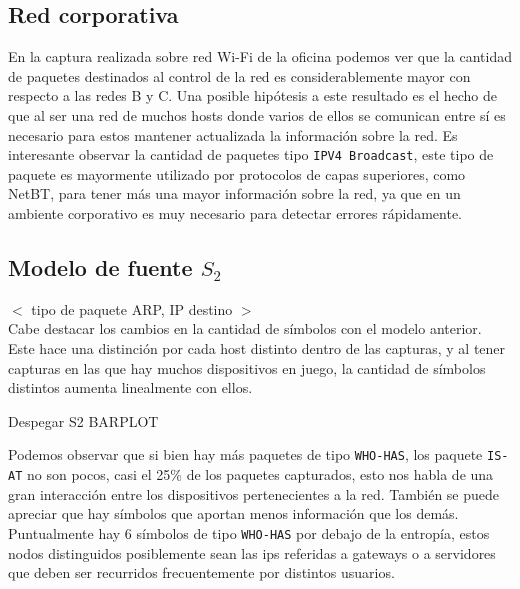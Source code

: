 \subsection{Red corporativa}

En la captura realizada sobre red Wi-Fi de la oficina podemos ver que la cantidad de paquetes destinados al control de la red es considerablemente mayor con respecto a las redes B y C. Una posible hipótesis a este resultado es el hecho de que al ser una red de muchos hosts donde varios de ellos se comunican entre sí es necesario para estos mantener actualizada la información sobre la red. Es interesante observar la cantidad de paquetes tipo \texttt{IPV4 Broadcast}, este tipo de paquete es mayormente utilizado por protocolos de capas superiores, como NetBT, para tener más una mayor información sobre la red, ya que en un ambiente corporativo es muy necesario para detectar errores rápidamente.


\subsection{Modelo de fuente $S_2$}


$<$ tipo de paquete ARP, IP destino $>$ \\


Cabe destacar los cambios en la cantidad de símbolos con el modelo anterior. Este hace una distinción por cada host distinto dentro de las capturas, y al tener capturas en las que hay muchos dispositivos en juego, la cantidad de símbolos distintos aumenta linealmente con ellos.

Despegar S2 BARPLOT

Podemos observar que si bien hay más paquetes de tipo \texttt{WHO-HAS}, los paquete \texttt{IS-AT} no son pocos, casi el 25\% de los paquetes capturados, esto nos habla de una gran interacción entre los dispositivos pertenecientes a la red. También se puede apreciar que hay símbolos que aportan menos información que los demás. Puntualmente hay 6 símbolos de tipo \texttt{WHO-HAS} por debajo de la entropía, estos nodos distinguidos posiblemente sean las ips referidas a gateways o a servidores que deben ser recurridos frecuentemente por distintos usuarios.


